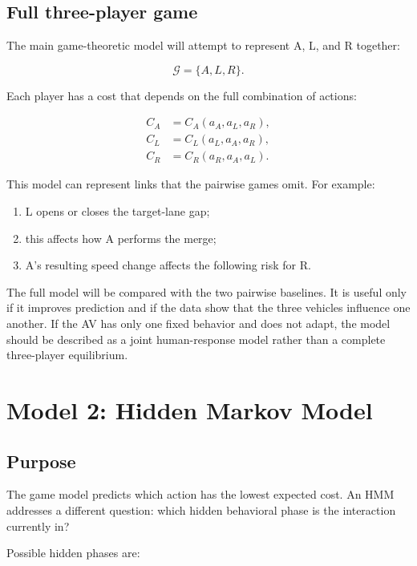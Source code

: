 \documentclass[11pt,a4paper]{article}
\begin{document}
\subsection{Full three-player game}

The main game-theoretic model will attempt to represent A, L, and R together:

\begin{equation}
\mathcal{G}=\{A,L,R\}.
\end{equation}

Each player has a cost that depends on the full combination of actions:

\begin{align}
C_A &= C_A(a_A,a_L,a_R),\\
C_L &= C_L(a_L,a_A,a_R),\\
C_R &= C_R(a_R,a_A,a_L).
\end{align}

This model can represent links that the pairwise games omit. For example:

\begin{enumerate}[noitemsep]
  \item L opens or closes the target-lane gap;
  \item this affects how A performs the merge;
  \item A's resulting speed change affects the following risk for R.
\end{enumerate}

The full model will be compared with the two pairwise baselines. It is useful only if it improves prediction and if the data show that the three vehicles influence one another. If the AV has only one fixed behavior and does not adapt, the model should be described as a joint human-response model rather than a complete three-player equilibrium.

\section{Model 2: Hidden Markov Model}

\subsection{Purpose}

The game model predicts which action has the lowest expected cost. An HMM addresses a different question: which hidden behavioral phase is the interaction currently in?

Possible hidden phases are:
\end{document}
